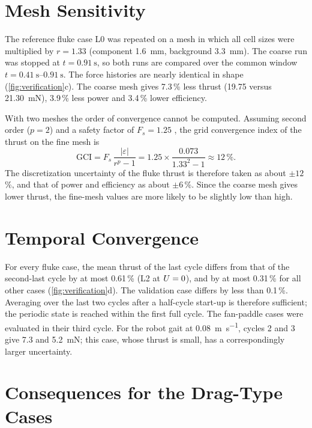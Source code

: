 \section{Mesh Sensitivity}
\label{sec:ver-mesh}

The reference fluke case L0 was repeated on a mesh in which all cell sizes were multiplied by $r=1.33$ (component
\SI{1.6}{\milli\metre}, background \SI{3.3}{\milli\metre}). The coarse run was stopped at $t=\SI{0.91}{\second}$,
so both runs are compared over the common window $t=\SIrange{0.41}{0.91}{\second}$. The force histories are
nearly identical in shape (\cref{fig:verification}c). The coarse mesh gives 7.3\,\% less thrust
(\SI{19.75}{} versus \SI{21.30}{\milli\newton}), 3.9\,\% less power and 3.4\,\% lower efficiency.

With two meshes the order of convergence cannot be computed. Assuming second order ($p=2$) and a safety factor of
$F_s=1.25$ \cite{Roache1994}, the grid convergence index of the thrust on the fine mesh is
\begin{equation}
  \mathrm{GCI} = F_s\,\frac{|\varepsilon|}{r^p-1} = 1.25\times\frac{0.073}{1.33^2-1} \approx 12\,\%.
  \label{eq:gci}
\end{equation}
The discretization uncertainty of the fluke thrust is therefore taken as about $\pm12$\,\%, and that of power and
efficiency as about $\pm6$\,\%. Since the coarse mesh gives lower thrust, the fine-mesh values are more likely to
be slightly low than high.

\section{Temporal Convergence}
\label{sec:ver-time}

For every fluke case, the mean thrust of the last cycle differs from that of the second-last cycle by at most
0.61\,\% (L2 at $U=0$), and by at most 0.31\,\% for all other cases (\cref{fig:verification}d). The validation
case differs by less than 0.1\,\%. Averaging over the last two cycles after a half-cycle start-up is therefore
sufficient; the periodic state is reached within the first full cycle. The fan-paddle cases were evaluated in their
third cycle. For the robot gait at \SI{0.08}{\metre\per\second}, cycles 2 and 3 give \SI{7.3}{} and
\SI{5.2}{\milli\newton}; this case, whose thrust is small, has a correspondingly larger uncertainty.

\section{Consequences for the Drag-Type Cases}
\label{sec:ver-drag}

